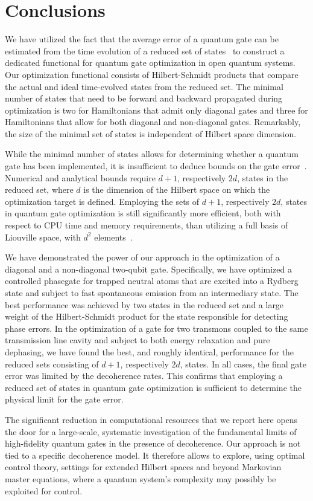 \section{Conclusions}
\label{sec:3st_concl}

We have utilized the fact that the average error of a quantum gate can
be estimated from the time evolution of a reduced set of
states~\cite{ReichKochPRA13,ReichKochPRL13} to
construct a dedicated functional for quantum gate optimization in
open quantum systems. Our
optimization functional consists of Hilbert-Schmidt products that
compare the actual and ideal time-evolved states from the reduced set. The
minimal number of states that need to be forward and backward
propagated during optimization is two for Hamiltonians that admit only
diagonal gates and three for Hamiltonians that allow for both diagonal
and non-diagonal gates. Remarkably, the size of the minimal set of
states is independent of Hilbert space dimension.

While the minimal number of states allows for determining whether
a quantum gate has been implemented, it is insufficient to deduce
bounds on the gate error~\cite{ReichKochPRA13}. Numerical and
analytical bounds require $d+1$, respectively $2d$, states in the
reduced set, where $d$ is the dimension of the Hilbert space on which
the optimization target is defined. Employing the
sets of $d+1$, respectively $2d$, states in quantum gate optimization
is still significantly
more efficient, both with respect to CPU time and memory requirements,
than utilizing a full basis of Liouville space, with
$d^2$ elements~\cite{KallushPRA06,OhtsukiNJP10,ToSHJPB11}.

We have demonstrated the power of our approach in the optimization of
a diagonal and a non-diagonal two-qubit gate. Specifically, we have
optimized a controlled phasegate for trapped neutral atoms that are
excited into a Rydberg state and subject to fast spontaneous emission
from an intermediary state. The best performance was achieved by two
states in the reduced set and a large weight of the Hilbert-Schmidt
product for the state responsible for detecting
phase errors. In the optimization of a \sqrtISWAP{} gate for two
transmons coupled to the same transmission line cavity and subject to
both energy relaxation and pure dephasing, we have
found the best, and roughly identical, performance for the reduced
sets consisting of $d+1$, respectively $2d$, states. In all cases, the
final gate error was limited by the decoherence rates. This confirms
that employing a reduced set of states in quantum gate optimization is
sufficient to determine the physical limit for the gate
error.

The significant reduction in computational resources that we report
here opens the door for a large-scale, systematic investigation of the
fundamental limits of high-fidelity quantum gates in the presence of
decoherence. Our approach is not tied to a specific decoherence
model. It therefore allows to explore, using optimal control theory,
settings for extended Hilbert spaces and beyond Markovian master
equations, where a quantum system's complexity
may possibly be exploited for control.

